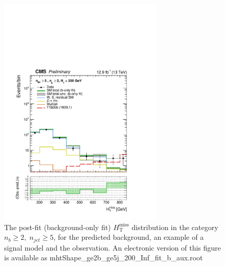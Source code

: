 \begin{figure}[tbhp]
    \caption{ 
    The post-fit (background-only fit) $H_{\mathrm{T}}^{\mathrm{miss}}$ distribution in the category $n_{b}\geq 2, \; n_{jet} \geq 5$, 
    for the predicted background, an example of a signal model and the observation.
    An electronic version of this figure is available as mhtShape\_ge2b\_ge5j\_200\_Inf\_fit\_b\_aux.root
    \label{fig:mhtShape_ge2b_ge5j_fit_b} }
  \begin{center}
  \includegraphics[width=0.7\textwidth]{mhtShape_ge2b_ge5j_200_Inf_fit_b_aux}
  \end{center}
\end{figure}
